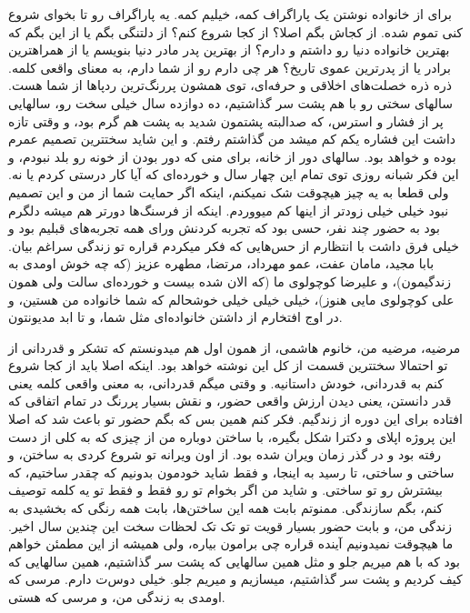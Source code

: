 \begin{flushright}
\foreignlanguage{persian}
{
برای از خانواده نوشتن یک پاراگراف کمه، خیلیم کمه. یه پاراگراف رو تا بخوای شروع کنی تموم شده. از کجاش بگم اصلا؟ از کجا شروع کنم؟ از دلتنگی بگم یا از این بگم که بهترین خانواده دنیا رو داشتم و دارم؟ از بهترین پدر مادر دنیا بنویسم یا از همراهترین برادر یا از پدرترین عموی تاریخ؟ هر چی دارم رو از شما دارم، به معنای واقعی کلمه. ذره ذره خصلت‌های اخلاقی و حرفه‌ای، توی همشون پررنگ‌ترین ردپاها از شما هست. سالهای سختی رو با هم پشت سر گذاشتیم، ده دوازده سال خیلی سخت رو، سالهایی پر از فشار و استرس، که صدالبته پشتمون شدید به پشت هم گرم بود، و وقتی تازه داشت این فشاره یکم کم میشد من گذاشتم رفتم. و این شاید سختترین تصمیم عمرم بوده و خواهد بود. سالهای دور از خانه، برای منی که دور بودن از خونه رو بلد نبودم، و این فکر شبانه روزی توی تمام این چهار سال و خورده‌ای که آیا کار درستی کردم یا نه. ولی قطعا به یه چیز هیچوقت شک نمیکنم، اینکه اگر حمایت شما از من و این تصمیم نبود خیلی خیلی زودتر از اینها کم میووردم. اینکه از فرسنگ‌ها دورتر هم میشه دلگرم بود به حضور چند نفر، حسی بود که تجربه کردنش ورای همه تجربه‌های قبلیم بود و خیلی فرق داشت با انتظارم از حس‌هایی که فکر میکردم قراره تو زندگی سراغم بیان. بابا مجید، مامان عفت، عمو مهرداد، مرتضا، مطهره عزیز (که چه خوش اومدی به زندگیمون)، و علیرضا کوچولوی ما (که الان شده بیست و خورده‌ای سالت ولی همون علی کوچولوی مایی هنوز)، خیلی خیلی خیلی خوشحالم که شما خانواده من هستین، و در اوج افتخارم از داشتن خانواده‌ای مثل شما، و تا ابد مدیونتون.
}
\end{flushright}

\begin{flushright}
\foreignlanguage{persian}
{
مرضیه، مرضیه من، خانوم هاشمی، از همون اول هم میدونستم که تشکر و قدردانی از تو احتمالا سختترین قسمت از کل این نوشته خواهد بود. اینکه اصلا باید از کجا شروع کنم به قدردانی، خودش داستانیه. و وقتی میگم قدردانی، به معنی واقعی کلمه یعنی قدر دانستن، یعنی دیدن ارزش واقعی حضور، و نقش بسیار پررنگ در تمام اتفاقی که افتاده برای این دوره از زندگیم. فکر کنم همین بس که بگم حضور تو باعث شد که اصلا این پروژه اپلای و دکترا شکل بگیره، با ساختن دوباره من از چیزی که به کلی از دست رفته بود و در گذر زمان ویران شده بود. از اون ویرانه تو شروع کردی به ساختن، و ساختی و ساختی، تا رسید به اینجا، و فقط شاید خودمون بدونیم که چقدر ساختیم، که بیشترش رو تو ساختی. و شاید من اگر بخوام تو رو فقط و فقط تو یه کلمه توصیف کنم، بگم سازندگی. ممنوتم بابت همه این ساختن‌ها، بابت همه رنگی که بخشیدی به زندگی من، و بابت حضور بسیار قویت تو تک تک لحظات سخت این چندین سال اخیر. ما هیچوقت نمیدونیم آینده قراره چی برامون بیاره، ولی همیشه از این مطمئن خواهم بود که با هم میریم جلو و مثل همین سالهایی که پشت سر گذاشتیم، همین سالهایی که کیف کردیم و پشت سر گذاشتیم، میسازیم و میریم جلو. خیلی دوس‌ت دارم. مرسی که اومدی به زندگی من، و مرسی که هستی.
}
\end{flushright}

